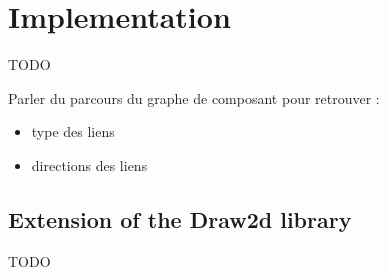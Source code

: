 \chapter{Implementation} %
\label{cha:Implementation}

TODO

Parler du parcours du graphe de composant pour retrouver :
\begin{itemize}
    \item type des liens
    \item directions des liens
\end{itemize}

\section{Extension of the Draw2d library} %
\label{sec:Extension of the Draw2d library}

TODO



